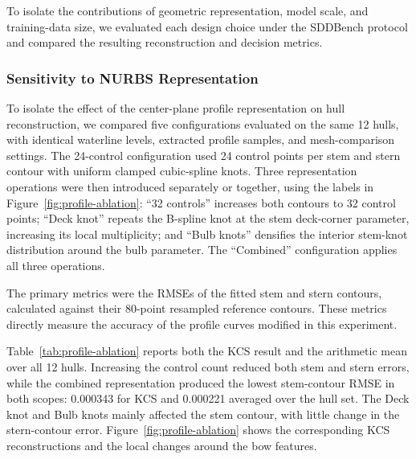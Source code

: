 \documentclass[a4paper,fleqn]{cas-dc}
\begin{document}
To isolate the contributions of geometric representation, model scale, and
training-data size, we evaluated each design choice under the SDDBench protocol
and compared the resulting reconstruction and decision metrics.

\subsubsection{Sensitivity to NURBS Representation}
\label{sec:ablation-nurbs}

To isolate the effect of the center-plane profile representation on hull
reconstruction, we compared five configurations evaluated on the same 12 hulls,
with identical waterline levels, extracted profile samples, and mesh-comparison
settings. The 24-control configuration used 24 control points per stem and stern
contour with uniform clamped cubic-spline knots. Three representation operations
were then introduced separately or together, using the labels in
Figure~\ref{fig:profile-ablation}: ``32 controls'' increases both contours to 32
control points; ``Deck knot'' repeats the B-spline knot at the stem deck-corner
parameter, increasing its local multiplicity; and ``Bulb knots'' densifies the
interior stem-knot distribution around the bulb parameter. The ``Combined''
configuration applies all three operations.

The primary metrics were the RMSEs of the fitted stem and stern contours, calculated against their 80-point resampled reference contours. These
metrics directly measure the accuracy of the profile curves modified in this
experiment.

Table~\ref{tab:profile-ablation} reports both the KCS result and the arithmetic
mean over all 12 hulls. Increasing the control count reduced both stem and stern
errors, while the combined representation produced the lowest stem-contour RMSE
in both scopes: 0.000343 for KCS and 0.000221 averaged over the hull set. The
Deck knot and Bulb knots mainly affected the stem contour, with little change in
the stern-contour error. Figure~\ref{fig:profile-ablation} shows
the corresponding KCS reconstructions and the local changes around the bow
features.
\end{document}

